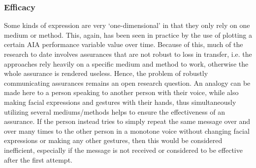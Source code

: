 \subsubsection{Efficacy}
Some kinds of expression are very `one-dimensional' in that they only rely on one medium or method. This, again, has been seen in practice by the use of plotting a certain AIA performance variable value over time. Because of this, much of the research to date involves assurances that are not robust to loss in transfer, i.e. the approaches rely heavily on a specific medium and method to work, otherwise the whole assurance is rendered useless. 
Hence, the problem of robustly communicating assurances remains an open research question. 
An analogy can be made here to a person speaking to another person with their voice, while also making facial expressions and gestures with their hands, thus simultaneously utilizing several mediums/methods helps to ensure the effectiveness of an assurance. 
If the person instead tries to simply repeat the same message over and over many times to the other person in a monotone voice without changing facial expressions or making any other gestures, then this would be considered inefficient, especially if the message is not received or considered to be effective after the first attempt. %
    
